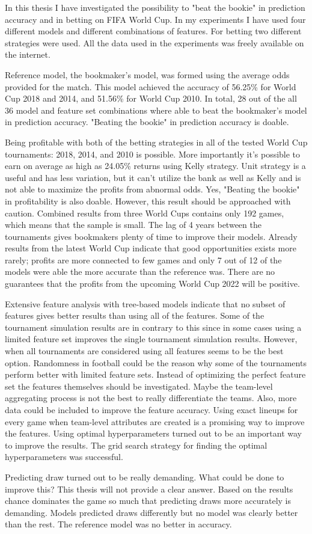 In this thesis I have investigated the possibility to "beat the bookie" in prediction accuracy and in betting on FIFA World Cup. In my experiments I have used four different models and different combinations of features. For betting two different strategies were used. All the data used in the experiments was freely available on the internet.

Reference model, the bookmaker's model, was formed using the average odds provided for the match. This model achieved the accuracy of 56.25\% for World Cup 2018 and 2014, and 51.56\% for World Cup 2010. In total, 28 out of the all 36 model and feature set combinations where able to beat the bookmaker's model in prediction accuracy. "Beating the bookie" in prediction accuracy is doable.

Being profitable with both of the betting strategies in all of the tested World Cup tournaments: 2018, 2014, and 2010 is possible. More importantly it's possible to earn on average as high as 24.05\% returns using Kelly strategy. Unit strategy is a useful and has less variation, but it can't utilize the bank as well as Kelly and is not able to maximize the profits from abnormal odds. Yes, "Beating the bookie" in profitability is also doable. However, this result should be approached with caution. Combined results from three World Cups contains only 192 games, which means that the sample is small. The lag of 4 years between the tournaments gives bookmakers plenty of time to improve their models. Already results from the latest World Cup indicate that good opportunities exists more rarely; profits are more connected to few games and only 7 out of 12 of the models were able the more accurate than the reference was. There are no guarantees that the profits from the upcoming World Cup 2022 will be positive.

Extensive feature analysis with tree-based models indicate that no subset of features gives better results than using all of the features. Some of the tournament simulation results are in contrary to this since in some cases using a limited feature set improves the single tournament simulation results. However, when all tournaments are considered using all features seems to be the best option. Randomness in football could be the reason why some of the tournaments perform better with limited feature sets. Instead of optimizing the perfect feature set the features themselves should be investigated. Maybe the team-level aggregating process is not the best to really differentiate the teams. Also, more data could be included to improve the feature accuracy. Using exact lineups for every game when team-level attributes are created is a promising way to improve the features. Using optimal hyperparameters turned out to be an important way to improve the results. The grid search strategy for finding the optimal hyperparameters was successful.

Predicting draw turned out to be really demanding. What could be done to improve this? This thesis will not provide a clear answer. Based on the results chance dominates the game so much that predicting draws more accurately is demanding. Models predicted draws differently but no model was clearly better than the rest. The reference model was no better in accuracy.

